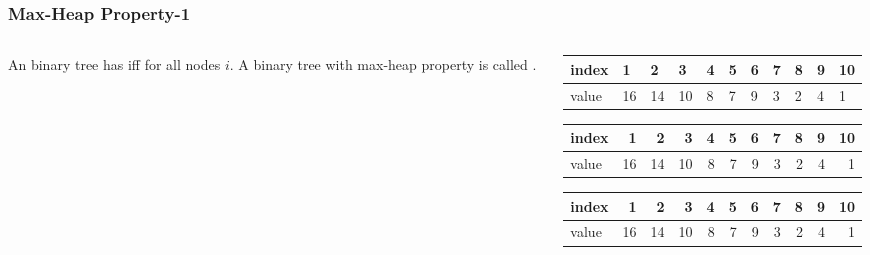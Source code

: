 \documentclass[10pt]{beamer}
\begin{document}
\begin{frame}[t]\frametitle{Max-Heap Property-1}

	\vspace{-0.5cm}
	\begin{columns}[T] %
	\begin{column}{.5\linewidth} %
	{\footnotesize 
		\begin{definition}
			An binary tree   has   
			iff
			 for all nodes $i$.
			A binary tree with max-heap property is called .
		\end{definition}
		
	} %
	\end{column} %
	\begin{column}{.5\linewidth} %
		\begin{example}
		{\scriptsize
			
		} %
		{\tiny 

\begin{tabular}
{
|@{~}p{.5cm}@{}
|@{~}p{.3cm}@{~}	|@{~}p{.3cm}@{~}
|@{~}p{.3cm}@{~}	|@{~}p{.3cm}@{~}	|@{~}p{.3cm}@{~}	|@{~}p{.3cm}@{~}	
|@{~}p{.3cm}@{~}	|@{~}p{.3cm}@{~}	|@{~}p{.3cm}@{~}	|@{~}p{.3cm}@{~}	|
}
\hline
index & 1     & 2     & 3     & 4     & 5     & 6     & 7     & 8     & 9     & 10      \\
\hline
value & 16    & 14    & 10    & 8     & 7     & 9     & 3     & 2     & 4     & 1       \\
\hline
\end{tabular}%

			\begin{tabular}
			{|
			@{~}l@{~}
			||@{~}r@{~}
			||@{~}r@{~} |@{~}r@{~}
			||@{~}r@{~}|@{~}r@{~}|@{~}r@{~}|@{~}r@{~}
			||@{~}r@{~}|@{~}r@{~}|@{~}r@{~}
			|}
			\hline
			index	&1	&2	&3	&4	&5	&6	&7	&8	&9	&10\\	
			\hline
			value	&16	&14	&10	&8	&7	&9	&3	&2	&4	&1\\
			\hline
			\end{tabular}

			\begin{tabular}
			{| l	|| r| r| r	| r	| r	| r	| r	| r	| r	| r	|}
			\hline
			index	&1	&2	&3	&4	&5	&6	&7	&8	&9	&10\\	
			\hline
			value	&16	&14	&10	&8	&7	&9	&3	&2	&4	&1\\
			\hline
			\end{tabular}

}
\end{example}
\end{column}
\end{columns}
\end{frame}
\end{document}
